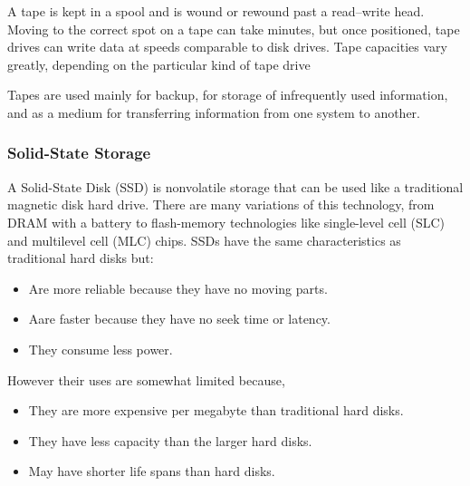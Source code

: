 A tape is kept in a spool and is wound or rewound past a read–write head.
Moving to the correct spot on a tape can take minutes, but once positioned, tape drives can write data at speeds comparable to disk drives.
Tape capacities vary greatly, depending on the particular kind of tape drive

Tapes are used mainly for backup, for storage of infrequently used information, and as a medium for transferring information from one system to another.

\subsubsection{Solid-State Storage}\label{subsubsec:Solid_State_Storage}
A Solid-State Disk (SSD) is nonvolatile storage that can be used like a traditional magnetic disk hard drive.
There are many variations of this technology, from DRAM with a battery to flash-memory technologies like single-level cell (SLC) and multilevel cell (MLC) chips.
SSDs have the same characteristics as traditional hard disks but:
\begin{itemize}[noitemsep]
\item Are more reliable because they have no moving parts.
\item Aare faster because they have no seek time or latency.
\item They consume less power.
\end{itemize}

However their uses are somewhat limited because,
\begin{itemize}[noitemsep]
\item They are more expensive per megabyte than traditional hard disks.
\item They have less capacity than the larger hard disks.
\item May have shorter life spans than hard disks.
\end{itemize}


